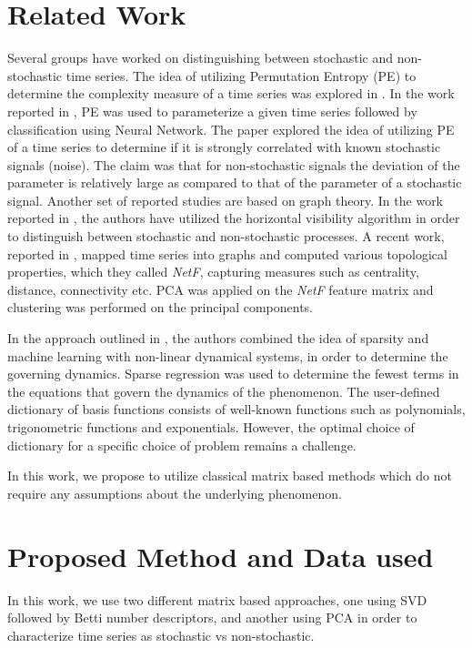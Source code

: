 \documentclass[journal]{IEEEtran}
\begin{document}
\section{Related Work}
Several groups have worked on distinguishing between stochastic and non-stochastic time series. The idea of utilizing Permutation Entropy (PE) to determine the complexity measure of a time series was explored in \cite{Bandt2002}. In the work reported in \cite{Boaretto2021}, PE was used to parameterize a given time series  followed by classification using  Neural Network. The paper explored the idea of utilizing PE of a time series to determine if it is strongly correlated with known stochastic signals (noise).   The claim was that for non-stochastic signals the deviation of the parameter is relatively large as compared to that of the parameter of a stochastic signal. Another set of reported studies are based on  graph theory. In the work reported in \cite{lacasa2010}, the authors have utilized the horizontal visibility algorithm in order to distinguish between stochastic and non-stochastic processes. A recent work, reported in \cite{Silva2022}, mapped time series into  graphs and computed various topological properties, which they called \textit{NetF}, capturing  measures such as centrality, distance, connectivity etc. PCA was applied on the \textit{NetF} feature matrix and clustering was performed on the principal components.

 In the approach outlined in \cite{Brunton2016}, the authors combined the idea of sparsity and machine learning with non-linear dynamical systems, in order to determine the governing dynamics. Sparse regression was used to determine the fewest terms in the equations that govern the dynamics of the phenomenon. The user-defined dictionary of basis functions consists of well-known functions such as polynomials, trigonometric functions and exponentials. However, the optimal choice of dictionary for a specific choice of problem remains a challenge.

In this work, we propose to utilize classical matrix based methods which do not require any assumptions about the underlying phenomenon.

\section{Proposed Method and Data used}

In this work, we use two different matrix based approaches, one using SVD followed by  Betti number descriptors, and  another using PCA in order to characterize time series as stochastic vs non-stochastic.
\end{document}
